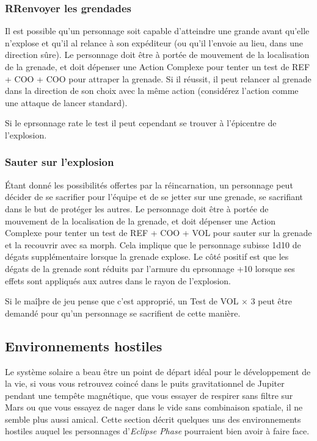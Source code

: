 \subsubsection{RRenvoyer les grendades} 

Il est possible qu'un personnage soit capable d'atteindre une grande avant qu'elle n'explose et qu'il al relance à son expéditeur (ou qu'il l'envoie au lieu, dans une direction sûre). Le personnage doit être à portée de mouvement de la localisation de la grenade, et doit dépenser une Action Complexe pour tenter un test de REF + COO + COO pour attraper la grenade. Si il réussit, il peut relancer al grenade dans la direction de son choix avec la même action (considérez l'action comme une attaque de lancer standard). 

Si le eprsonnage rate le test il peut cependant se trouver à l'épicentre de l'explosion. 

\subsubsection{Sauter sur l'explosion} 

Étant donné les possibilités offertes par la réincarnation, un personnage peut décider de se sacrifier pour l'équipe et de se jetter sur une grenade, se sacrifiant dans le but de protéger les autres. Le personnage doit être à portée de mouvement de la localisation de la grenade, et doit dépenser une Action Complexe pour tenter un test de REF + COO + VOL pour sauter sur la grenade et la recouvrir avec sa morph. Cela implique que le personnage subisse 1d10 de dégats supplémentaire lorsque la grenade explose. Le côté positif est que les dégats de la grenade sont réduits par l'armure du eprsonnage +10 lorsque ses effets sont appliqués aux autres dans le rayon de l'explosion. 

Si le maîþre de jeu pense que c'est approprié, un Test de VOL $\times$ 3 peut être demandé pour qu'un personnage se sacrifient de cette manière. 

\subsection{Environnements hostiles} \label{sec:hostile-environments} Le système solaire a beau être un point de départ idéal pour le développement de la vie, si vous vous retrouvez coincé dans le puits gravitationnel de Jupiter pendant une tempête magnétique, que vous essayer de respirer sans filtre sur Mars ou que vous essayez de nager dans le vide sans combinaison spatiale, il ne semble plus aussi amical. Cette section décrit quelques uns des environnements hostiles auquel les personnages d'\emph{Eclipse Phase} pourraient bien avoir à faire face. 

